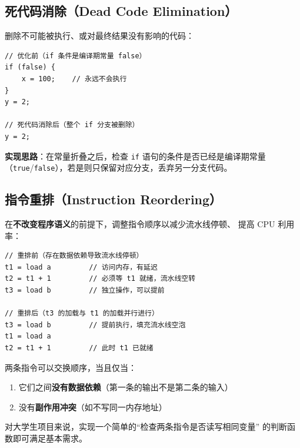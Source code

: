 \documentclass[12pt, a4paper]{ctexart}
\begin{document}
\subsection{死代码消除（Dead Code Elimination）}

删除不可能被执行、或对最终结果没有影响的代码：

\begin{lstlisting}[caption={死代码消除示例}]
// 优化前（if 条件是编译期常量 false）
if (false) {
    x = 100;    // 永远不会执行
}
y = 2;

// 死代码消除后（整个 if 分支被删除）
y = 2;
\end{lstlisting}

\textbf{实现思路}：在常量折叠之后，检查 \texttt{if} 语句的条件是否已经是编译期常量
（\texttt{true}/\texttt{false}），若是则只保留对应分支，丢弃另一分支代码。

\subsection{指令重排（Instruction Reordering）}

在\textbf{不改变程序语义}的前提下，调整指令顺序以减少流水线停顿、
提高 CPU 利用率：

\begin{lstlisting}[caption={指令重排示例（减少数据依赖等待）}]
// 重排前（存在数据依赖导致流水线停顿）
t1 = load a         // 访问内存，有延迟
t2 = t1 + 1         // 必须等 t1 就绪，流水线空转
t3 = load b         // 独立操作，可以提前

// 重排后（t3 的加载与 t1 的加载并行进行）
t3 = load b         // 提前执行，填充流水线空泡
t1 = load a
t2 = t1 + 1         // 此时 t1 已就绪
\end{lstlisting}

\begin{tipbox}[何时可以重排]
两条指令可以交换顺序，当且仅当：
\begin{enumerate}[noitemsep]
  \item 它们之间\textbf{没有数据依赖}（第一条的输出不是第二条的输入）
  \item 没有\textbf{副作用冲突}（如不写同一内存地址）
\end{enumerate}
对大学生项目来说，实现一个简单的``检查两条指令是否读写相同变量''
的判断函数即可满足基本需求。
\end{tipbox}
\end{document}

